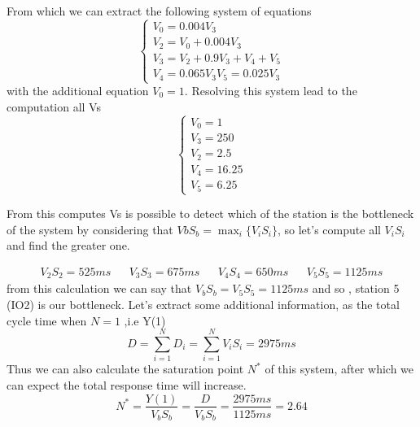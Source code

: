 \documentclass[12pt,a4paper]{article}
\begin{document}
    From which we can extract the following system of equations 
    \begin{displaymath}
        \begin{cases}
            V_0=0.004V_3\\
            V_2=V_0+0.004V_3\\
            V_3=V_2+0.9V_3+V_4+V_5\\
            V_4=0.065V_3
            V_5= 0.025V_3
        \end{cases}
    \end{displaymath}
    with the additional equation $V_0=1$. Resolving this system lead to the computation 
    all Vs 
    \begin{displaymath}
        \begin{cases}
            V_0=1 \\
            V_3=250\\
            V_2=2.5\\
            V_4=16.25\\
            V_5=6.25
        \end{cases}
    \end{displaymath}

    From this computes Vs is possible to detect which of the station is the bottleneck of the system
    by considering that $VbS_b= \max_i\{V_iS_i\}$, so let's compute all $V_iS_i$ and find 
    the greater one. 

    \begin{displaymath}
        \begin{aligned}
            V_2S_2= 525ms && V_3S_3=675ms && V_4S_4=650ms && V_5S_5= 1125ms
        \end{aligned}
    \end{displaymath}
    from this calculation we can say that $V_bS_b=V_5S_5=1125ms$ and so , station 5 (IO2) is 
    our bottleneck. Let's extract some additional information, as the total cycle time when $N=1$ ,i.e Y(1) 
    \begin{displaymath}
        D=\sum_{i=1}^{N}D_i=\sum_{i=1}^{N}V_iS_i=2975ms
    \end{displaymath}
    Thus we can also calculate the saturation point $N^*$ of this system, after which we can expect
    the total response time will increase. 
    \begin{displaymath}
        N^*=\frac{Y(1)}{V_bS_b}=\frac{D}{V_bS_b}=\frac{2975ms}{1125ms}=2.64
    \end{displaymath}

    
\end{document}
